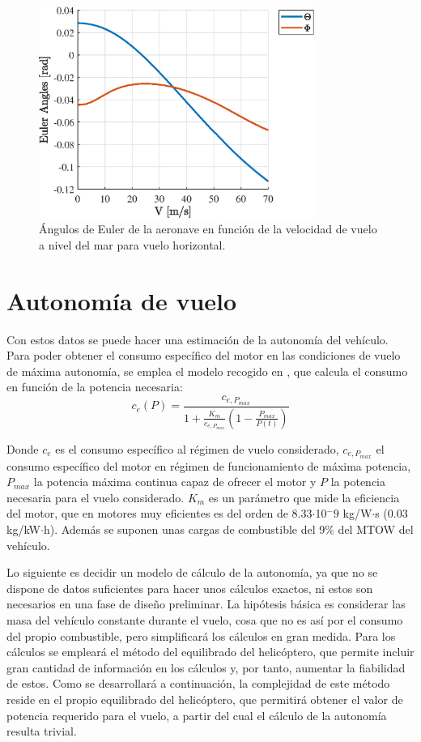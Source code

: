 \begin{figure}
	\centering
	\includegraphics[width=90mm]{graficos/EulerVH}
	\caption{Ángulos de Euler de la aeronave en función de la velocidad de vuelo a nivel del mar para vuelo horizontal.}
	\label{EulerVH}
\end{figure}

\section{Autonomía de vuelo}

Con estos datos se puede hacer una estimación de la autonomía del vehículo. 
Para poder obtener el consumo específico del motor en las condiciones de vuelo de máxima autonomía, se emplea el modelo recogido en \citet{Cuerva}, que calcula el consumo en función de la potencia necesaria:
\begin{equation}
	c_e(P)=\frac{c_{e,P_{max}}}{1+\frac{K_m}{c_{e,P_{max}}}(1-\frac{P_{max}}{P(t)})}
	\label{consumo}
\end{equation}

Donde $c_e$ es el consumo específico al régimen de vuelo considerado, $c_{e,P_{max}}$ el consumo específico del motor en régimen de funcionamiento de máxima potencia, $P_{max}$ la potencia máxima continua capaz de ofrecer el motor y $P$ la potencia necesaria para el vuelo considerado.
$K_m$ es un parámetro que mide la eficiencia del motor, que en motores muy eficientes es del orden de 8.33$\cdot$10$^-9$ kg/W$\cdot$s (0.03 kg/kW$\cdot$h).
Además se suponen unas cargas de combustible del 9\% del MTOW del vehículo. 

Lo siguiente es decidir un modelo de cálculo de la autonomía, ya que no se dispone de datos suficientes para hacer unos cálculos exactos, ni estos son necesarios en una fase de diseño preliminar. La hipótesis básica es considerar las masa del vehículo constante durante el vuelo, cosa que no es así por el consumo del propio combustible, pero simplificará los cálculos en gran medida.
Para los cálculos se empleará el método del equilibrado del helicóptero, que permite incluir gran cantidad de información en los cálculos y, por tanto, aumentar la fiabilidad de estos. Como se desarrollará a continuación, la complejidad de este método reside en el propio equilibrado del helicóptero, que permitirá obtener el valor de potencia requerido para el vuelo, a partir del cual el cálculo de la autonomía resulta trivial.

